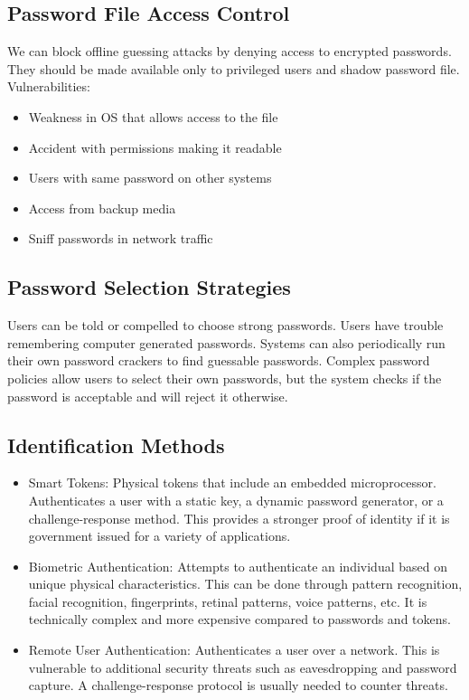 \documentclass{math}
\begin{document}
\subsection*{Password File Access Control}
We can block offline guessing attacks by denying access to encrypted passwords.
They should be made available only to privileged users and shadow password file.
Vulnerabilities:
\begin{itemize}
  \item Weakness in OS that allows access to the file
  \item Accident with permissions making it readable
  \item Users with same password on other systems
  \item Access from backup media
  \item Sniff passwords in network traffic
\end{itemize}

\subsection*{Password Selection Strategies}
Users can be told or compelled to choose strong passwords. Users have trouble
remembering computer generated passwords. Systems can also periodically run
their own password crackers to find guessable passwords. Complex password
policies allow users to select their own passwords, but the system checks if
the password is acceptable and will reject it otherwise.

\subsection*{Identification Methods}
\begin{itemize}
  \item Smart Tokens: Physical tokens that include an embedded microprocessor.
  Authenticates a user with a static key, a dynamic password generator, or a
  challenge-response method. This provides a stronger proof of identity if it
  is government issued for a variety of applications.
  \item Biometric Authentication: Attempts to authenticate an individual based
  on unique physical characteristics. This can be done through pattern
  recognition, facial recognition, fingerprints, retinal patterns, voice
  patterns, etc. It is technically complex and more expensive compared to
  passwords and tokens.
  \item Remote User Authentication: Authenticates a user over a network. This
  is vulnerable to additional security threats such as eavesdropping and
  password capture. A challenge-response protocol is usually needed to counter
  threats.
\end{itemize}
\end{document}
